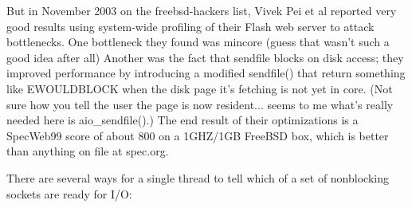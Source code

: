 \documentclass[12pt, twoside, a4paper, xetex]{report}
\begin{document}
But in November 2003 on the freebsd-hackers list, Vivek Pei et al reported very good results using system-wide profiling of their Flash web server to attack bottlenecks. One bottleneck they found was mincore (guess that wasn't such a good idea after all) Another was the fact that sendfile blocks on disk access; they improved performance by introducing a modified sendfile() that return something like EWOULDBLOCK when the disk page it's fetching is not yet in core. (Not sure how you tell the user the page is now resident... seems to me what's really needed here is aio\_sendfile().) The end result of their optimizations is a SpecWeb99 score of about 800 on a 1GHZ/1GB FreeBSD box, which is better than anything on file at spec.org.

There are several ways for a single thread to tell which of a set of nonblocking sockets are ready for I/O:
\end{document}
